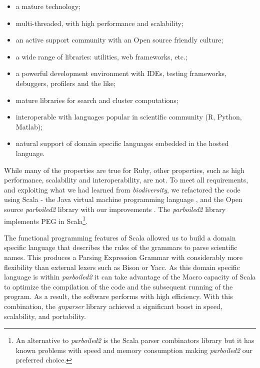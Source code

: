 \documentclass{bmcart}
\begin{document}
\begin{itemize}

    \item a mature technology;

    \item multi-threaded, with high performance and scalability;

    \item an active support community with an Open source friendly culture;

    \item a wide range of libraries: utilities, web frameworks, etc.;

    \item a powerful development environment with IDEs, testing frameworks,
      debuggers, profilers and the like;

    \item mature libraries for search and cluster computations;

    \item interoperable with languages popular in scientific community (R,
      Python, Matlab);

    \item natural support of domain specific languages embedded in the hosted
      language.

\end{itemize}

While many of the properties are true for Ruby, other properties, such as high performance, scalability and interoperability, are not. To meet all requirements, and exploiting what we had learned from \textit{biodiversity}, we refactored the code using Scala - the Java virtual machine programming language \cite{odersky2004overview}, and the Open source \textit{parboiled2} library \cite{parboiled2, myltsev-parboiled2} with our improvements \cite{parboiled2-gna}. The \textit{parboiled2} library implements PEG in Scala\footnote{An alternative to \textit{parboiled2} is the Scala parser combinators library \cite{moors2008parser} but it has known problems with speed and memory consumption making \textit{parboiled2} our preferred choice.}.

The functional programming features of Scala allowed us to build a domain specific language that describes the rules of the grammars to parse scientific names. This produces a Parsing Expression Grammar with considerably more flexibility than external lexers such as Bison or Yacc. As this domain specific language is within \textit{parboiled2} it can take advantage of the Macro capacity of Scala \cite{Burmako:2013:SML:2489837.2489840} to optimize the compilation of the code and the subsequent running of the program. As a result, the software performs with high efficiency. With this combination, the \textit{gnparser} library achieved a significant boost in speed, scalability, and portability.
\end{document}
